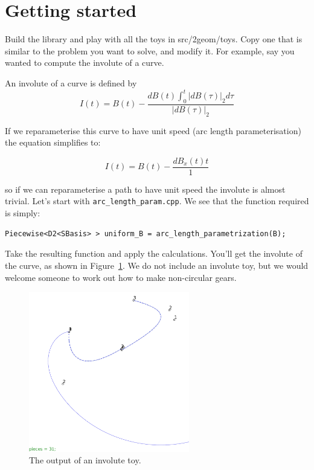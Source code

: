 \documentclass[openany]{book}
\begin{document}
\section{Getting started}

Build the library and play with all the toys in src/2geom/toys.  Copy one that is similar to the problem you want to solve, and modify it.  For example, say you wanted to compute the involute of a curve.

An involute of a curve is defined by
$$I(t) = B(t) - \frac{dB(t) \int_0^t|dB(\tau)|_2 d\tau}{|dB(\tau)|_2}$$

If we reparameterise this curve to have unit speed (arc length parameterisation) the equation simplifies to:

$$I(t) = B(t) - \frac{dB_x(t) t}{1}$$

so if we can reparameterise a path to have unit speed the involute is almost trivial.  Let's start with \verb|arc_length_param.cpp|.  We see that the function required is simply:
\begin{verbatim}
Piecewise<D2<SBasis> > uniform_B = arc_length_parametrization(B);
\end{verbatim}

Take the resulting function and apply the calculations.  You'll get
the involute of the curve, as shown in Figure~\ref{fig:involute-toy}.
We do not include an involute toy, but we would welcome someone to
work out how to make non-circular gears.

\begin{figure}
  \begin{center}
    \includegraphics[width=70mm]{media/involute.pdf}
    \caption{The output of an involute toy.}
    \label{fig:involute-toy}
  \end{center}
\end{figure}
\end{document}
